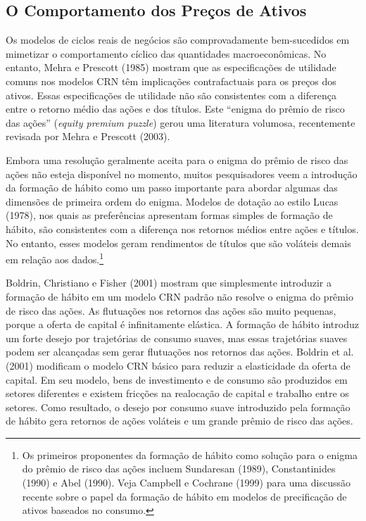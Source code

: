\documentclass[12pt]{article}
\begin{document}
\subsection*{O Comportamento dos Preços de Ativos}

Os modelos de ciclos reais de negócios são comprovadamente bem-sucedidos em mimetizar o comportamento cíclico das quantidades macroeconômicas. No entanto, Mehra e Prescott (1985) mostram que as especificações de utilidade comuns nos modelos CRN têm implicações contrafactuais para os preços dos ativos. Essas especificações de utilidade não são consistentes com a diferença entre o retorno médio das ações e dos títulos. Este “enigma do prêmio de risco das ações” (\textit{equity premium puzzle}) gerou uma literatura volumosa, recentemente revisada por Mehra e Prescott (2003).

Embora uma resolução geralmente aceita para o enigma do prêmio de risco das ações não esteja disponível no momento, muitos pesquisadores veem a introdução da formação de hábito como um passo importante para abordar algumas das dimensões de primeira ordem do enigma. Modelos de dotação ao estilo Lucas (1978), nos quais as preferências apresentam formas simples de formação de hábito, são consistentes com a diferença nos retornos médios entre ações e títulos. No entanto, esses modelos geram rendimentos de títulos que são voláteis demais em relação aos dados.\footnote{Os primeiros proponentes da formação de hábito como solução para o enigma do prêmio de risco das ações incluem Sundaresan (1989), Constantinides (1990) e Abel (1990). Veja Campbell e Cochrane (1999) para uma discussão recente sobre o papel da formação de hábito em modelos de precificação de ativos baseados no consumo.}

Boldrin, Christiano e Fisher (2001) mostram que simplesmente introduzir a formação de hábito em um modelo CRN padrão não resolve o enigma do prêmio de risco das ações. As flutuações nos retornos das ações são muito pequenas, porque a oferta de capital é infinitamente elástica. A formação de hábito introduz um forte desejo por trajetórias de consumo suaves, mas essas trajetórias suaves podem ser alcançadas sem gerar flutuações nos retornos das ações. Boldrin et al. (2001) modificam o modelo CRN básico para reduzir a elasticidade da oferta de capital. Em seu modelo, bens de investimento e de consumo são produzidos em setores diferentes e existem fricções na realocação de capital e trabalho entre os setores. Como resultado, o desejo por consumo suave introduzido pela formação de hábito gera retornos de ações voláteis e um grande prêmio de risco das ações.
\end{document}
